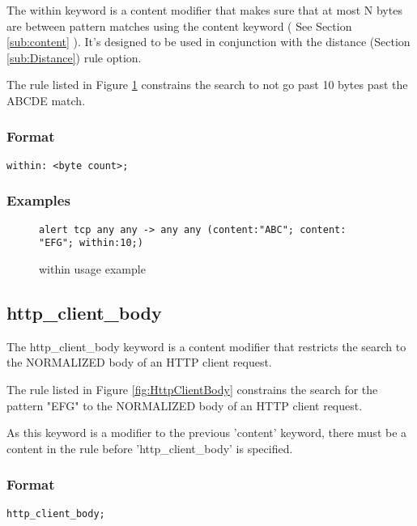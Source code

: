 \documentclass[english]{report}
\begin{document}
The within keyword is a content modifier that makes sure that
at most N bytes are between pattern matches using the content keyword ( See
Section \ref{sub:content} ).  It's designed to be used in conjunction
with the distance (Section \ref{sub:Distance}) rule option.

The rule listed in Figure \ref{fig:Within} constrains the search to not
go past 10 bytes past the ABCDE match. 

\subsubsection{Format}

\begin{verbatim}
within: <byte count>;
\end{verbatim}

\subsubsection{Examples}

\begin{figure}[!hbpt]
\begin{verbatim}
alert tcp any any -> any any (content:"ABC"; content: "EFG"; within:10;)
\end{verbatim}
\caption{within usage example \label{fig:Within}}
\end{figure}

\subsection{http\_client\_body\label{sub:HttpClientBody}}

The http\_client\_body keyword is a content modifier that restricts
the search to the NORMALIZED body of an HTTP client request.

The rule listed in Figure \ref{fig:HttpClientBody} constrains the
search for the pattern "EFG" to the NORMALIZED body of an HTTP client request.

As this keyword is a modifier to the previous 'content' keyword, there must be
a content in the rule before 'http\_client\_body' is specified.

\subsubsection{Format}

\begin{verbatim}
http_client_body;
\end{verbatim}
\end{document}
